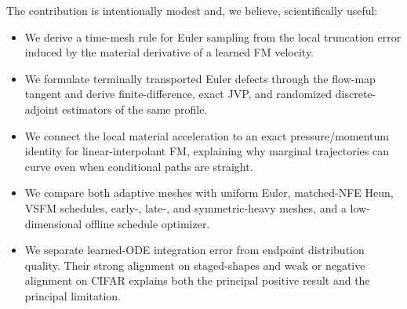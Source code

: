 The contribution is intentionally modest and, we believe, scientifically useful:
\begin{itemize}
  \item We derive a time-mesh rule for Euler sampling from the local truncation error induced by
  the material derivative of a learned FM velocity.
  \item We formulate terminally transported Euler defects through the flow-map tangent and derive
  finite-difference, exact JVP, and randomized discrete-adjoint estimators of the same profile.
  \item We connect the local material acceleration to an exact pressure/momentum identity for linear-interpolant
  FM, explaining why marginal trajectories can curve even when conditional paths are straight.
  \item We compare both adaptive meshes with uniform Euler, matched-NFE Heun, VSFM schedules,
  early-, late-, and symmetric-heavy meshes, and a low-dimensional offline schedule optimizer.
  \item We separate learned-ODE integration error from endpoint distribution quality. Their strong
  alignment on staged-shapes and weak or negative alignment on CIFAR explains both the principal
  positive result and the principal limitation.
\end{itemize}
